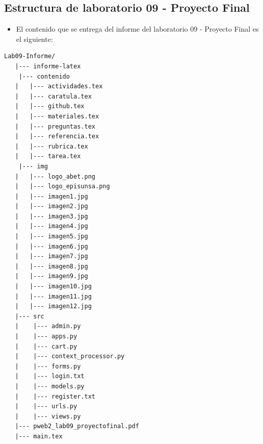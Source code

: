 \subsection{Estructura de laboratorio 09 - Proyecto Final}
\begin{itemize}	
	\item El contenido que se entrega del informe del laboratorio 09 - Proyecto Final es el siguiente:
\end{itemize}

\begin{lstlisting}[style=ascii-tree]
	Lab09-Informe/
   |--- informe-latex
	|--- contenido
   |   |--- actividades.tex
   |   |--- caratula.tex
   |   |--- github.tex
   |   |--- materiales.tex
   |   |--- preguntas.tex
   |   |--- referencia.tex
   |   |--- rubrica.tex
   |   |--- tarea.tex
	|--- img
   |   |--- logo_abet.png
   |   |--- logo_episunsa.png
   |   |--- imagen1.jpg
   |   |--- imagen2.jpg
   |   |--- imagen3.jpg
   |   |--- imagen4.jpg
   |   |--- imagen5.jpg
   |   |--- imagen6.jpg
   |   |--- imagen7.jpg
   |   |--- imagen8.jpg
   |   |--- imagen9.jpg
   |   |--- imagen10.jpg
   |   |--- imagen11.jpg
   |   |--- imagen12.jpg
   |--- src
   |    |--- admin.py
   |    |--- apps.py
   |    |--- cart.py
   |    |--- context_processor.py
   |    |--- forms.py
   |    |--- login.txt
   |    |--- models.py
   |    |--- register.txt
   |    |--- urls.py
   |    |--- views.py
   |--- pweb2_lab09_proyectofinal.pdf    
   |--- main.tex
\end{lstlisting}    